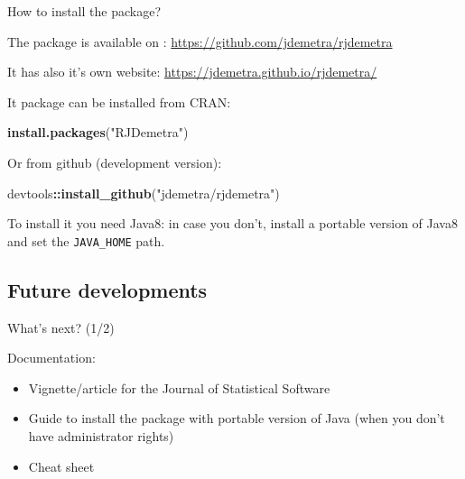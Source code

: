\documentclass[10pt,xcolor=table,color={dvipsnames,usenames},ignorenonframetext,usepdftitle=false,french]{beamer}
\newenvironment{Shaded}{\begin{snugshade}}{\end{snugshade}}
\newcommand{\KeywordTok}[1]{\textcolor[rgb]{0.13,0.29,0.53}{\textbf{#1}}}
\newcommand{\NormalTok}[1]{#1}
\newcommand{\OperatorTok}[1]{\textcolor[rgb]{0.81,0.36,0.00}{\textbf{#1}}}
\newcommand{\StringTok}[1]{\textcolor[rgb]{0.31,0.60,0.02}{#1}}
\begin{document}
\begin{frame}[fragile]{How to install the package?}
\protect\hypertarget{how-to-install-the-package-1}{}

The package is available on \large\faGithub\normalsize:
\url{https://github.com/jdemetra/rjdemetra}

It has also it's own website:
\url{https://jdemetra.github.io/rjdemetra/}

It package can be installed from CRAN:

\begin{Shaded}
\begin{Highlighting}[]
\KeywordTok{install.packages}\NormalTok{(}\StringTok{"RJDemetra"}\NormalTok{)}
\end{Highlighting}
\end{Shaded}

Or from github (development version):

\begin{Shaded}
\begin{Highlighting}[]
\NormalTok{devtools}\OperatorTok{::}\KeywordTok{install_github}\NormalTok{(}\StringTok{"jdemetra/rjdemetra"}\NormalTok{)}
\end{Highlighting}
\end{Shaded}

\bcinfo To install it you need Java8: in case you don't, install a
portable version of Java8 and set the \texttt{JAVA\_HOME} path.

\end{frame}

\hypertarget{future-developments}{%
\subsection{Future developments}\label{future-developments}}

\begin{frame}{What's next? \bcpanchant (1/2)}
\protect\hypertarget{whats-next-12}{}

Documentation:

\begin{itemize}
\item
  Vignette/article for the Journal of Statistical Software
\item
  Guide to install the package with portable version of Java (when you
  don't have administrator rights)
\item
  Cheat sheet
\end{itemize}

\end{frame}
\end{document}

